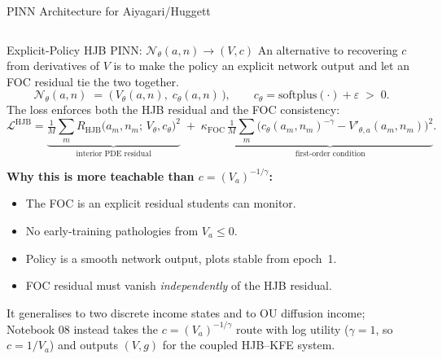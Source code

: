 \documentclass[aspectratio=169,11pt]{beamer}
\newcommand{\emphc}[1]{\textcolor{harvardcrimson}{#1}}
\begin{document}
\begin{frame}{PINN Architecture for Aiyagari/Huggett}
\begin{columns}[T]
\begin{center}
\end{center}
\end{columns}
\end{frame}

\begin{frame}{Explicit-Policy HJB PINN: $\mathcal{N}_\theta(a,n) \to (V, c)$}
\small
An alternative to recovering $c$ from derivatives of $V$ is to make the policy an explicit network output and let an FOC residual tie the two together.
\vspace{-0.3em}
\[
\mathcal{N}_\theta(a, n) \;=\; \bigl(\,V_\theta(a, n),\; c_\theta(a, n)\,\bigr),
\qquad c_\theta = \mathrm{softplus}(\cdot) + \varepsilon \;>\; 0.
\]
The loss enforces \emphc{both} the HJB residual \emphc{and} the FOC consistency:
\vspace{-0.3em}
\[
\mathcal{L}^{\text{HJB}} =
\underbrace{\tfrac{1}{M}\sum_m R_{\text{HJB}}\bigl(a_m, n_m;\, V_\theta, c_\theta\bigr)^2}_{\text{interior PDE residual}}
\;+\;
\kappa_{\text{FOC}}\,\underbrace{\tfrac{1}{M}\sum_m \bigl(c_\theta(a_m,n_m)^{-\gamma} - V'_{\theta,a}(a_m,n_m)\bigr)^2}_{\text{first-order condition}}.
\]

\textbf{Why this is more teachable than $c = (V_a)^{-1/\gamma}$:}
\begin{itemize}\itemsep0pt
    \item The FOC is an \emphc{explicit residual} students can monitor.
    \item No early-training pathologies from $V_a \le 0$.
    \item Policy is a smooth network output, plots stable from epoch~1.
    \item FOC residual must vanish \emph{independently} of the HJB residual.
\end{itemize}

{\footnotesize It generalises to two discrete income states and to OU diffusion income; Notebook 08 instead takes the $c=(V_a)^{-1/\gamma}$ route with log utility ($\gamma=1$, so $c=1/V_a$) and outputs $(V,g)$ for the coupled HJB--KFE system.}
\end{frame}
\end{document}
